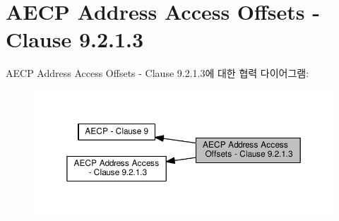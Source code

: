 \hypertarget{group___a_e_c_p___a_a__offsets}{}\section{A\+E\+CP Address Access Offsets -\/ Clause 9.2.1.3}
\label{group___a_e_c_p___a_a__offsets}
A\+E\+CP Address Access Offsets -\/ Clause 9.2.1.3에 대한 협력 다이어그램\+:
\nopagebreak
\begin{figure}[H]
\begin{center}
\leavevmode
\includegraphics[width=350pt]{group___a_e_c_p___a_a__offsets}
\end{center}
\end{figure}
